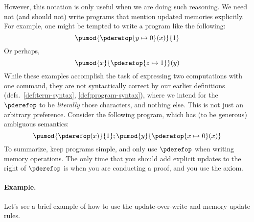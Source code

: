 \documentclass[11pt,twoside]{scrartcl}
\begin{document}
However, this notation is only useful when we are doing such reasoning. We need not (and should not) write programs that mention updated memories explicitly.
For example, one might be tempted to write a program like the following:
\[
\pumod{\memupd{\pderefop}{y}{0}(x)}{1}
\]
Or perhaps,
\[
\pumod{x}{\memupd{\pderefop}{z}{1}}(y)
\]
While these examples accomplish the task of expressing two computations with one command, they are not syntactically correct by our earlier definitions (defs.~\ref{def:term-syntax}, \ref{def:program-syntax}), where we intend for the $\pderefop$ to be \emph{literally} those characters, and nothing else.
This is not just an arbitrary preference.
Consider the following program, which has (to be generous) ambiguous semantics:
\[
\pumod{\pderefop(x)}{1};
\pumod{y}{\memupd{\pderefop}{x}{0}(x)}
\]
To summarize, keep programs simple, and only use $\pderefop$ when writing memory operations. The only time that you should add explicit updates to the right of $\pderefop$ is when you are conducting a proof, and you use the  axiom.

\paragraph{Example.}
Let's see a brief example of how to use the update-over-write and memory update rules.
\end{document}

